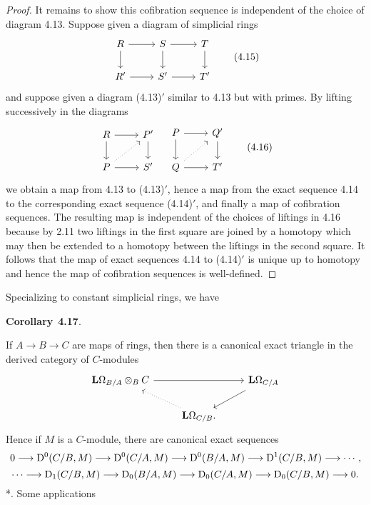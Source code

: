 \documentclass[10pt,reqno]{amsart}
\newenvironment{env}[2]{
\par\medskip\noindent\textbf{#1}~\textbf{#2}.\,\itshape
}
\newcommand{\lra}{\longrightarrow}
\renewcommand{\L}{\mathbf{L}}
\newcommand{\D}{\mathrm{D}}
\newcommand{\Diff}{\Omega}
\newcommand{\LD}{\L\Diff}
\begin{document}
\begin{proof}
It remains to show this cofibration sequence is independent of the choice of diagram 4.13. Suppose given a diagram of
simplicial rings
\[
  \begin{tikzcd}
    R\ar[r]\ar[d] & S\ar[r]\ar[d] & T\ar[d]\\
    R'\ar[r] & S'\ar[r] & T'
  \end{tikzcd}
  \tag{4.15}
\]
and suppose given a diagram (4.13)$'$ similar to 4.13 but with primes. By lifting successively in the diagrams
\[
  \begin{tikzcd}
    R\ar[r]\ar[d] & P'\ar[d]\\
    P\ar[ur,dotted]\ar[r] & S'
  \end{tikzcd}
  \quad
  \begin{tikzcd}
    P\ar[r]\ar[d] & Q'\ar[d]\\
    Q\ar[ur,dotted]\ar[r] & T'
  \end{tikzcd}
  \tag{4.16}
\]
we obtain a map from 4.13 to (4.13)$'$, hence a map from the exact sequence 4.14 to the corresponding exact sequence
(4.14)$'$, and finally a map of cofibration sequences. The resulting map is independent of the choices of liftings in
4.16 because by 2.11 two liftings in the first square are joined by a homotopy which may then be extended to a homotopy
between the liftings in the second square. It follows that the map of exact sequences 4.14 to (4.14)$'$ is unique up to
homotopy and hence the map of cofibration sequences is well-defined.
\end{proof}

Specializing to constant simplicial rings, we have
\begin{env}{Corollary}{4.17}
If $A\to B\to C$ are maps of rings, then there is a canonical exact triangle in the derived category of $C$-modules
\[
  \begin{tikzcd}
    \LD_{B/A}\otimes_B C\ar[rr] & & \LD_{C/A}\ar[ld]\\
    & \LD_{C/B}\ar[ul,dotted].
  \end{tikzcd}
\]
Hence if $M$ is a $C$-module, there are canonical exact sequences
\[
  0\lra\D^0(C/B,M)\lra\D^0(C/A,M)\lra\D^0(B/A,M)\lra\D^1(C/B,M)\lra\cdots,
\]
\[
  \cdots\lra\D_1(C/B,M)\lra\D_0(B/A,M)\lra\D_0(C/A,M)\lra\D_0(C/B,M)\lra 0.
\]
\end{env}

\subsection*{. Some applications}
\end{document}
